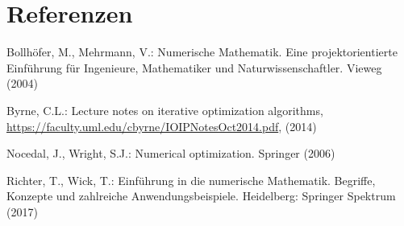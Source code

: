 \documentclass[
]{book}
\newenvironment{cslreferences}%
  {}%
  {\par}
\theoremstyle{definition}
\theoremstyle{definition}
\theoremstyle{definition}
\theoremstyle{definition}
\theoremstyle{remark}
\begin{document}
\hypertarget{referenzen}{%
\chapter*{Referenzen}\label{referenzen}}

\hypertarget{refs}{}
\begin{cslreferences}
\leavevmode\hypertarget{ref-BolM04}{}%
Bollhöfer, M., Mehrmann, V.: Numerische Mathematik. Eine projektorientierte Einführung für Ingenieure, Mathematiker und Naturwissenschaftler. Vieweg (2004)

\leavevmode\hypertarget{ref-Byr14}{}%
Byrne, C.L.: Lecture notes on iterative optimization algorithms, \url{https://faculty.uml.edu/cbyrne/IOIPNotesOct2014.pdf}, (2014)

\leavevmode\hypertarget{ref-NocW06}{}%
Nocedal, J., Wright, S.J.: Numerical optimization. Springer (2006)

\leavevmode\hypertarget{ref-RicW17}{}%
Richter, T., Wick, T.: Einführung in die numerische Mathematik. Begriffe, Konzepte und zahlreiche Anwendungsbeispiele. Heidelberg: Springer Spektrum (2017)
\end{cslreferences}
\end{document}
